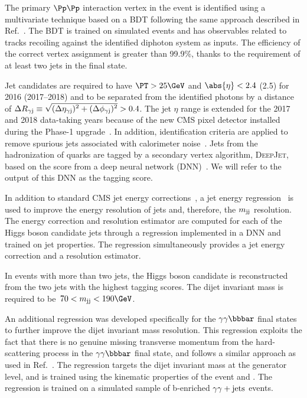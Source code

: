 \documentclass[11pt,twoside,a4paper,cmspaper,final,collab]{cms-tdr}
\begin{document}
The primary $\Pp\Pp$ interaction vertex in the event is identified using a multivariate technique based on a BDT following the same approach described in Ref.~\cite{Khachatryan:2014ira}. The BDT is trained on simulated \ggH events and has observables related to tracks recoiling against the identified diphoton system as inputs. The efficiency of the correct vertex assignment is greater than 99.9\%, thanks to the requirement of at least two jets in the \bbgg final state.

Jet candidates are required to have $\PT > 25 \GeV$ and $\abs{\eta} < 2.4$ (2.5) for 2016 (2017--2018) and to be separated from the identified photons by a distance of $\Delta R_{\gamma \text{j}} \equiv \sqrt{\smash[b]{(\Delta \eta_{\gamma \text{j}})^2 +(\Delta \phi_{\gamma \text{j}})^2}}  > 0.4$. The jet $\eta$ range is extended for the 2017 and 2018 data-taking years because of the new CMS pixel detector installed during the Phase-1 upgrade~\cite{Vormwald_2019}. In addition, identification criteria
are applied to remove spurious jets associated with calorimeter noise~\cite{PUJID}. Jets from the hadronization of {\cPqb} quarks are tagged by a secondary vertex algorithm, \textsc{DeepJet}, 
based on the score from a deep neural network (DNN)~\cite{CMS-DP-2018-058,Bols:2020bkb}. We will refer to the
output of this DNN as the {\cPqb} tagging score.

In addition to standard CMS jet energy corrections~\cite{JINST6}, a {\cPqb} jet energy regression~\cite{Sirunyan:2019wwa} is used to improve the energy resolution of {\cPqb} jets and, therefore, the $m_\text{jj}$ resolution. The energy correction and resolution estimator are computed for each of the Higgs boson candidate jets through a regression implemented in a DNN and trained on jet properties. The regression simultaneously provides a {\cPqb} jet energy correction and a resolution estimator.

In events with more than two jets, the Higgs boson candidate is reconstructed from the two jets with the highest {\cPqb} tagging scores. The dijet invariant mass is required to be~\mbox{$70 < \Mjj < 190\GeV$}.

An additional regression was developed specifically for the $\bbgg$ final states to further improve the dijet invariant mass resolution. This regression exploits the fact that there is no genuine missing transverse momentum from the hard-scattering process in the $\bbgg$ final state, and follows a similar approach as used in Ref.~\cite{Sirunyan:2018iwt}. The regression targets the dijet invariant mass at the generator level, and is trained using the kinematic properties of the event and \ptmiss. The regression is trained on a simulated sample of b-enriched $\gamma\gamma+\text{jets}$ events.
\end{document}
